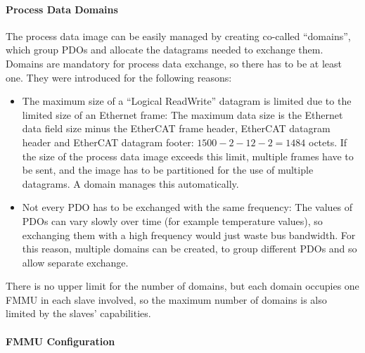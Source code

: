 \documentclass[a4paper,12pt,BCOR6mm,bibtotoc,idxtotoc]{scrbook}
\begin{document}
\paragraph{Process Data Domains}

The process data image can be easily managed by creating co-called
``domains'', which group PDOs and allocate the datagrams needed to
exchange them. Domains are mandatory for process data exchange, so
there has to be at least one. They were introduced for the following
reasons:

\begin{itemize}
\item The maximum size of a ``Logical ReadWrite'' datagram is limited
  due to the limited size of an Ethernet frame: The maximum data size
  is the Ethernet data field size minus the EtherCAT frame header,
  EtherCAT datagram header and EtherCAT datagram footer: $1500 - 2 -
  12 - 2 = 1484$ octets. If the size of the process data image exceeds
  this limit, multiple frames have to be sent, and the image has to be
  partitioned for the use of multiple datagrams. A domain manages this
  automatically.
\item Not every PDO has to be exchanged with the same frequency: The
  values of PDOs can vary slowly over time (for example temperature
  values), so exchanging them with a high frequency would just waste
  bus bandwidth. For this reason, multiple domains can be created, to
  group different PDOs and so allow separate exchange.
\end{itemize}

There is no upper limit for the number of domains, but each domain
occupies one FMMU in each slave involved, so the maximum number of
domains is also limited by the slaves' capabilities.

\paragraph{FMMU Configuration}
\end{document}
